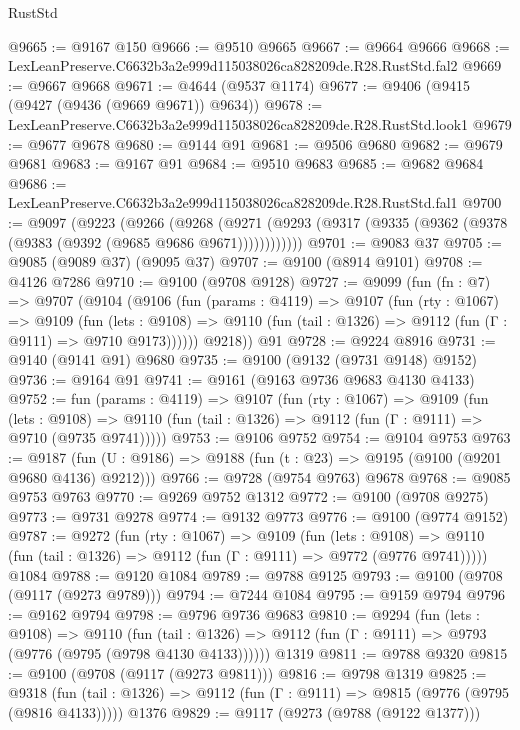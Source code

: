 \begin{lexlean}{RustStd}
\begin{coremodule}
@9665 := @9167 @150
@9666 := @9510 @9665
@9667 := @9664 @9666
@9668 := LexLeanPreserve.C6632b3a2e999d115038026ca828209de.R28.RustStd.fal2
@9669 := @9667 @9668
@9671 := @4644 (@9537 @1174)
@9677 := @9406 (@9415 (@9427 (@9436 (@9669 @9671)) @9634))
@9678 := LexLeanPreserve.C6632b3a2e999d115038026ca828209de.R28.RustStd.look1
@9679 := @9677 @9678
@9680 := @9144 @91
@9681 := @9506 @9680
@9682 := @9679 @9681
@9683 := @9167 @91
@9684 := @9510 @9683
@9685 := @9682 @9684
@9686 := LexLeanPreserve.C6632b3a2e999d115038026ca828209de.R28.RustStd.fal1
@9700 := @9097
    (@9223
      (@9266
        (@9268
          (@9271 (@9293 (@9317 (@9335 (@9362 (@9378 (@9383 (@9392 (@9685 @9686 @9671))))))))))))
@9701 := @9083 @37
@9705 := @9085 (@9089 @37) (@9095 @37)
@9707 := @9100 (@8914 @9101)
@9708 := @4126 @7286
@9710 := @9100 (@9708 @9128)
@9727 := @9099
    (fun (fn : @7) =>
    @9707
      (@9104
        (@9106
          (fun (params : @4119) =>
          @9107
            (fun (rty : @1067) =>
            @9109
              (fun (lets : @9108) =>
              @9110 (fun (tail : @1326) => @9112 (fun (Γ : @9111) => @9710 @9173))))))
        @9218))
    @91
@9728 := @9224 @8916
@9731 := @9140 (@9141 @91) @9680
@9735 := @9100 (@9132 (@9731 @9148) @9152)
@9736 := @9164 @91
@9741 := @9161 (@9163 @9736 @9683 @4130 @4133)
@9752 := fun (params : @4119) =>
  @9107
    (fun (rty : @1067) =>
    @9109
      (fun (lets : @9108) =>
      @9110 (fun (tail : @1326) => @9112 (fun (Γ : @9111) => @9710 (@9735 @9741)))))
@9753 := @9106 @9752
@9754 := @9104 @9753
@9763 := @9187 (fun (U : @9186) => @9188 (fun (t : @23) => @9195 (@9100 (@9201 @9680 @4136) @9212)))
@9766 := @9728 (@9754 @9763) @9678
@9768 := @9085 @9753 @9763
@9770 := @9269 @9752 @1312
@9772 := @9100 (@9708 @9275)
@9773 := @9731 @9278
@9774 := @9132 @9773
@9776 := @9100 (@9774 @9152)
@9787 := @9272
    (fun (rty : @1067) =>
    @9109
      (fun (lets : @9108) =>
      @9110 (fun (tail : @1326) => @9112 (fun (Γ : @9111) => @9772 (@9776 @9741)))))
    @1084
@9788 := @9120 @1084
@9789 := @9788 @9125
@9793 := @9100 (@9708 (@9117 (@9273 @9789)))
@9794 := @7244 @1084
@9795 := @9159 @9794
@9796 := @9162 @9794
@9798 := @9796 @9736 @9683
@9810 := @9294
    (fun (lets : @9108) =>
    @9110
      (fun (tail : @1326) => @9112 (fun (Γ : @9111) => @9793 (@9776 (@9795 (@9798 @4130 @4133))))))
    @1319
@9811 := @9788 @9320
@9815 := @9100 (@9708 (@9117 (@9273 @9811)))
@9816 := @9798 @1319
@9825 := @9318
    (fun (tail : @1326) => @9112 (fun (Γ : @9111) => @9815 (@9776 (@9795 (@9816 @4133)))))
    @1376
@9829 := @9117 (@9273 (@9788 (@9122 @1377)))

\end{coremodule}
\end{lexlean}
